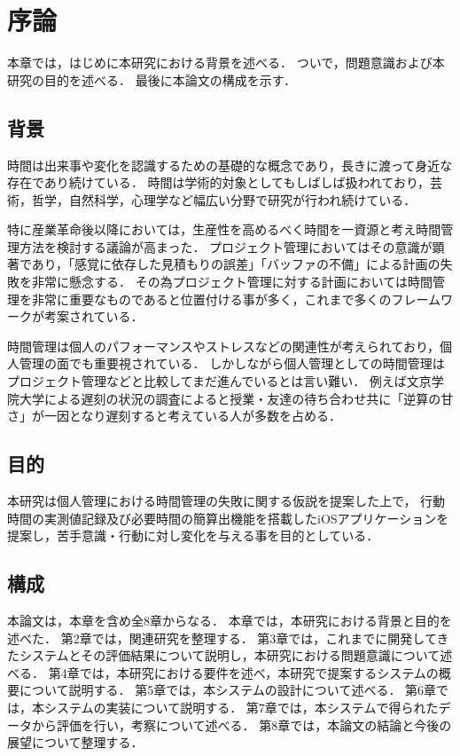 \chapter{序論}
本章では，はじめに本研究における背景を述べる．
ついで，問題意識および本研究の目的を述べる．
最後に本論文の構成を示す．

\section{背景}
時間は出来事や変化を認識するための基礎的な概念であり，長きに渡って身近な存在であり続けている\cite{history}．
時間は学術的対象としてもしばしば扱われており，芸術，哲学，自然科学，心理学など幅広い分野で研究が行われ続けている．

特に産業革命後以降においては，生産性を高めるべく時間を一資源と考え時間管理方法を検討する議論が高まった\cite{Taylor1911}．
プロジェクト管理においてはその意識が顕著であり，「感覚に依存した見積もりの誤差」「バッファの不備」による計画の失敗を非常に懸念する\cite{innopm}．
その為プロジェクト管理に対する計画においては時間管理を非常に重要なものであると位置付ける事が多く，これまで多くのフレームワークが考案されている\cite{EORMS}．

時間管理は個人のパフォーマンス\cite{Barling1996}\cite{Britton1991}\cite{Trueman1996}やストレス\cite{Macan1994}などの関連性が考えられており，個人管理の面でも重要視されている\cite{Claessens2007}．
しかしながら個人管理としての時間管理はプロジェクト管理などと比較してまだ進んでいるとは言い難い．
例えば文京学院大学による遅刻の状況の調査によると授業・友達の待ち合わせ共に「逆算の甘さ」が一因となり遅刻すると考えている人が多数を占める\cite{bunkyo}．

\section{目的}
本研究は個人管理における時間管理の失敗に関する仮説を提案した上で，
行動時間の実測値記録及び必要時間の簡算出機能を搭載したiOSアプリケーションを提案し，苦手意識・行動に対し変化を与える事を目的としている．

\section{構成}
本論文は，本章を含め全8章からなる．
本章では，本研究における背景と目的を述べた．
第2章では，関連研究を整理する．
第3章では，これまでに開発してきたシステムとその評価結果について説明し，本研究における問題意識について述べる．
第4章では，本研究における要件を述べ，本研究で提案するシステムの概要について説明する．
第5章では，本システムの設計について述べる．
第6章では，本システムの実装について説明する．
第7章では，本システムで得られたデータから評価を行い，考察について述べる．
第8章では，本論文の結論と今後の展望について整理する．
